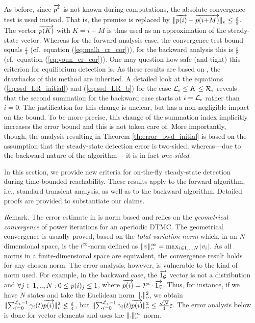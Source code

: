 \documentclass[times, 10pt,twocolumn]{article}
\begin{document}
		As before, since $\overrightarrow{p^{*}}$ is not known during computations, the absolute convergence test is used instead. That is, the premise is replaced by  $\lVert \overrightarrow{p(i)} - \overrightarrow{p(i{+}M)} \rVert_{v} \leq \frac{\varepsilon}{8}$.
		The vector $\overrightarrow{p(K)}$ with $K=i{+}M$ is thus used as an approximation of the steady-state vector. Whereas for the forward analysis case, the convergence test bound equals $\frac{\varepsilon}{4}$ (cf.\ equation (\ref{eq:malh_cr_cor})), for the backward analysis this is $\frac{\varepsilon}{8}$  (cf.\ equation (\ref{eq:youn_cr_cor})).  One may question how safe (and tight) this criterion for equilibrium detection is.  As these results are based on \cite{MalhotraMT_MR94}, the drawbacks of this method are inherited.  A detailed look at the equations (\ref{eq:ssd_LR_initial}) and (\ref{eq:ssd_LR_b}) for the case $\mathcal{L}_{\epsilon} \leq K \leq \mathcal{R}_{\epsilon}$ reveals that the second summation for the backward case starts at $i=\mathcal{L}_{\epsilon}$ rather than $i=0$.  The justification for this change is unclear, but has a non-negligible impact on the bound. To be more precise, this change of the summation index implicitly increases the error bound and this is not taken care of. More importantly, though,  the analysis resulting in Theorem \ref{th:error_bwd_initial} is based on the assumption that the steady-state detection error is two-sided, whereas---due to the backward nature of the algorithm--- it is in fact \emph{one-sided}.
		

	In this section, we provide new criteria for on-the-fly steady-state detection during time-bounded reachability.  These results apply to the forward algorithm, i.e., standard transient analysis, as well as to the backward algorithm.  Detailed proofs are provided to substantiate our claims.

	{\emph Remark.} The error estimate in \cite{MalhotraMT_MR94} is norm based and relies on the \emph{geometrical convergence} of power iterations for an aperiodic DTMC. The geometrical convergence is usually proved, based on the \emph{total variation norm} which, in an $N$-dimensional space, is the $l^{\infty}$-norm defined as $\lVert  v  \rVert_{v}^{\infty} = \max_{i \in 1,..,N} |v_{i}|$. As all norms in a finite-dimensional space are equivalent, the convergence result holds for any chosen norm.  The error analysis, however, is vulnerable to the kind of norm used.  For example, in the backward case, the $\overrightarrow{1_{\mathcal{G}}}$ vector is not a distribution and $\forall j \in 1,..,N: 0 \leq p(i)_{j} \leq 1$, where $\overrightarrow{p(i)}=\mathcal{P}^{i} \cdot \overrightarrow{1_{\mathcal{G}}}$. Thus, for instance, if we have $N$ states and take the Euclidean norm $\lVert  .  \rVert_{v}^{2}$, we obtain $\lVert  \sum_{i=0}^{\mathcal{L}_{\epsilon}-1} \gamma_{i}(t) \overrightarrow{p(i)}  \rVert_{v}^{2} \nleq \frac{\varepsilon}{4}$, but $\lVert  \sum_{i=0}^{\mathcal{L}_{\epsilon}-1} \gamma_{i}(t) \overrightarrow{p(i)}  \rVert_{v}^{2} \leq \frac{\sqrt{N}}{4}\varepsilon$.  The error analysis below is done for vector elements and uses the $\lVert  .  \rVert_{v}^{\infty}$ norm.
					
\end{document}
